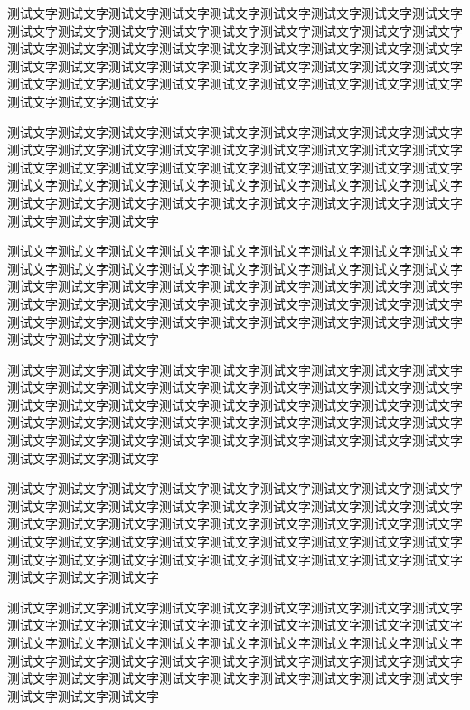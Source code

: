 \begin{QuestionItem}[2]
	\item 测试文字测试文字测试文字测试文字测试文字测试文字测试文字测试文字测试文字测试文字测试文字测试文字测试文字测试文字测试文字测试文字测试文字测试文字测试文字测试文字测试文字测试文字测试文字测试文字测试文字测试文字测试文字测试文字测试文字测试文字测试文字测试文字测试文字测试文字测试文字测试文字测试文字测试文字测试文字测试文字测试文字测试文字测试文字测试文字测试文字测试文字测试文字测试文字
	\item 测试文字测试文字测试文字测试文字测试文字测试文字测试文字测试文字测试文字测试文字测试文字测试文字测试文字测试文字测试文字测试文字测试文字测试文字测试文字测试文字测试文字测试文字测试文字测试文字测试文字测试文字测试文字测试文字测试文字测试文字测试文字测试文字测试文字测试文字测试文字测试文字测试文字测试文字测试文字测试文字测试文字测试文字测试文字测试文字测试文字测试文字测试文字测试文字
\end{QuestionItem}


\Thinking
	\begin{QuestionItem}
		\item 测试文字测试文字测试文字测试文字测试文字测试文字测试文字测试文字测试文字测试文字测试文字测试文字测试文字测试文字测试文字测试文字测试文字测试文字测试文字测试文字测试文字测试文字测试文字测试文字测试文字测试文字测试文字测试文字测试文字测试文字测试文字测试文字测试文字测试文字测试文字测试文字测试文字测试文字测试文字测试文字测试文字测试文字测试文字测试文字测试文字测试文字测试文字测试文字
		\item 测试文字测试文字测试文字测试文字测试文字测试文字测试文字测试文字测试文字测试文字测试文字测试文字测试文字测试文字测试文字测试文字测试文字测试文字测试文字测试文字测试文字测试文字测试文字测试文字测试文字测试文字测试文字测试文字测试文字测试文字测试文字测试文字测试文字测试文字测试文字测试文字测试文字测试文字测试文字测试文字测试文字测试文字测试文字测试文字测试文字测试文字测试文字测试文字
		\item 测试文字测试文字测试文字测试文字测试文字测试文字测试文字测试文字测试文字测试文字测试文字测试文字测试文字测试文字测试文字测试文字测试文字测试文字测试文字测试文字测试文字测试文字测试文字测试文字测试文字测试文字测试文字测试文字测试文字测试文字测试文字测试文字测试文字测试文字测试文字测试文字测试文字测试文字测试文字测试文字测试文字测试文字测试文字测试文字测试文字测试文字测试文字测试文字
		\item 测试文字测试文字测试文字测试文字测试文字测试文字测试文字测试文字测试文字测试文字测试文字测试文字测试文字测试文字测试文字测试文字测试文字测试文字测试文字测试文字测试文字测试文字测试文字测试文字测试文字测试文字测试文字测试文字测试文字测试文字测试文字测试文字测试文字测试文字测试文字测试文字测试文字测试文字测试文字测试文字测试文字测试文字测试文字测试文字测试文字测试文字测试文字测试文字
	\end{QuestionItem}


